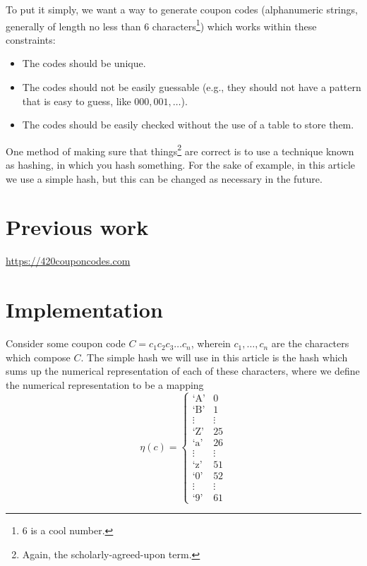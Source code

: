 \documentclass{article}
\begin{document}
\begin{multicols}{2}
To put it simply, we want a way to generate coupon codes (alphanumeric strings, generally of length no less than 6 characters\footnote{6 is a cool number.}) which works within these constraints:

\begin{itemize}
	\item The codes should be unique.
	\item The codes should not be easily guessable (e.g., they should not have a pattern that is easy to guess, like $000, 001, \dots$).
	\item The codes should be easily checked without the use of a table to store them.
\end{itemize}

One method of making sure that things\footnote{Again, the scholarly-agreed-upon term.} are correct is to use a technique known as hashing, in which you hash something. For the sake of example, in this article we use a simple hash, but this can be changed as necessary in the future.

\section{Previous work}

\href{https://420couponcodes.com}{https://420couponcodes.com}

\section{Implementation}

Consider some coupon code $C = c_1 c_2 c_3 \dots c_n$, wherein $c_1, \dots, c_n$ are the characters which compose $C$. The simple hash we will use in this article is the hash which sums up the numerical representation of each of these characters, where we define the numerical representation to be a mapping 
$$\eta(c) = \begin{cases} 
	\text{`A'} & 0 \\ 
	\text{`B'} & 1 \\
	\vdots & \vdots \\
	\text{`Z'} & 25 \\
	\text{`a'} & 26 \\
	\vdots & \vdots \\
	\text{`z'} & 51 \\
	\text{`0'} & 52 \\
	\vdots & \vdots \\
	\text{`9'} & 61 
\end{cases}$$


\end{multicols}
\end{document}

